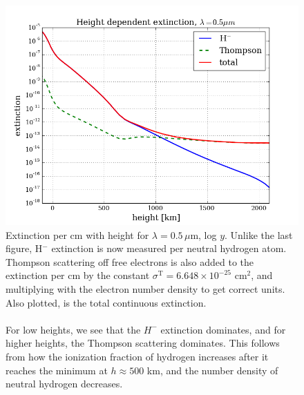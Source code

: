 \documentclass{article}
\begin{document}
\begin{figure}[H]
  \centering
  \includegraphics[scale=0.5]{../figures/task2/exthmin_3.png}
  \caption{Extinction per cm with height for $\lambda = 0.5\,\mu$m, log $y$. Unlike the last figure, H$^-$ extinction is now measured per neutral hydrogen atom. Thompson scattering off free electrons is also added to the extinction per cm by the constant $\sigma^{\text{T}} = 6.648\times10^{-25}$ cm$^2$, and multiplying with the electron number density to get correct units. Also plotted, is the total continuous extinction.\\\\For low heights, we see that the $H^{-}$ extinction dominates, and for higher heights, the Thompson scattering dominates. This follows from how the ionization fraction of hydrogen increases after it reaches the minimum at $h\approx500$ km, and the number density of neutral hydrogen decreases.}
\end{figure}
\end{document}
